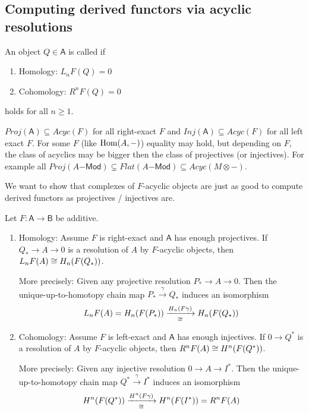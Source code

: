 \documentclass[fontsize=11pt,fleqn,a4paper]{scrartcl}
\begin{document}
\subsection{Computing derived functors via acyclic resolutions}

\begin{definition}
An object $Q\in\mathsf{A}$ is called  if
\begin{enumerate}
\item Homology: $L_n F(Q) = 0$
\item Cohomology: $R^n F(Q) = 0$
\end{enumerate}
holds for all $n\geq 1$.
\end{definition}

\begin{remark}
$Proj(\mathsf{A}) \subseteq Acyc(F)$ for all right-exact $F$ and $Inj(\mathsf{A})\subseteq Acyc(F)$ for all left exact $F$. For some $F$ (like $\operatorname{Hom}(A,-)$) equality may hold, but depending on $F$, the class of acyclics may be bigger then the class of projectives (or injectives). For example all $Proj(A\mathsf{-Mod}) \subsetneq Flat(A\mathsf{-Mod}) \subseteq Acyc(M\otimes-)$.

We want to show that complexes of $F$-acyclic objects are just as good to compute derived functors as projectives / injectives are.
\end{remark}

\begin{theorem}
Let $F:\mathsf{A}\to\mathsf{B}$ be additive.
\begin{multicols}{2}
\begin{enumerate}
\item Homology: Assume $F$ is right-exact and $\mathsf{A}$ has enough projectives. If $Q_\ast \to A\to 0$ is a resolution of $A$ by $F$-acyclic objects, then $L_nF(A) \cong H_n(F(Q_\ast))$.

More precisely: Given any projective resolution $P_\ast \to A \to 0$. Then the unique-up-to-homotopy chain map $P_\ast\xrightarrow{\gamma} Q_\ast$ induces an isomorphism 
\[L_nF(A) = H_n(F(P_\ast)) \xrightarrow[\cong]{H_n(F\gamma)} H_n(F(Q_\ast))\]

\item Cohomology: Assume $F$ is left-exact and $\mathsf{A}$ has enough injectives. If $0\to Q^\ast$ is a resolution of $A$ by $F$-acyclic objects, then $R^nF(A) \cong H^n(F(Q^\ast))$.

More precisely: Given any injective resolution $0\to A\to I^\ast$. Then the unique-up-to-homotopy chain map $Q^\ast\xrightarrow{\gamma} I^\ast$ induces an isomorphism
\[H^n(F(Q^\ast)) \xrightarrow[\cong]{H^n(F\gamma)} H^n(F(I^\ast))=R^nF(A)\]
\end{enumerate}
\end{multicols}
\end{theorem}
\end{document}
